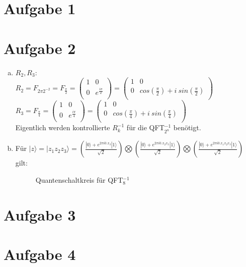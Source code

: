 \documentclass[a4paper]{scrartcl}
\begin{document}
\section*{Aufgabe 1}

\newpage
\section*{Aufgabe 2}
\begin{enumerate}[a)]
\item
$R_2, R_3:$\\
$R_2=F_{2\pi 2^{-2}}=F_{\frac{\pi}{2}} = 
\begin{pmatrix}
1 & 0 \\ 0 & e^{\frac{i \pi}{2}} \\
\end{pmatrix} = 
\begin{pmatrix}
1 & 0 \\ 0 & cos(\frac{\pi}{2})+i~sin(\frac{\pi}{2})\\
\end{pmatrix}$ \\
$R_3=F_{\frac{\pi}{4}} = 
\begin{pmatrix}
1 & 0 \\ 0 & e^{\frac{i \pi}{4}} \\
\end{pmatrix} = 
\begin{pmatrix}
1 & 0 \\ 0 & cos(\frac{\pi}{4})+i~sin(\frac{\pi}{4})\\
\end{pmatrix}$ \\
Eigentlich werden kontrollierte $R_k^{-1}$ für die QFT$_{2^n}^{-1}$ benötigt.

\item Für $|z\rangle = |z_1 z_2 z_3\rangle= (\frac{|0\rangle+e^{2\pi i0.x_3} |1\rangle }{\sqrt{2}})\bigotimes(\frac{|0\rangle+e^{2\pi i0.x_2x_3} |1\rangle }{\sqrt{2}})\bigotimes(\frac{|0\rangle+e^{2\pi i0.x_1x_2x_3} |1\rangle }{\sqrt{2}})$ gilt:

\begin{figure}[htp] 
\caption{Quantenschaltkreis für QFT$_{8}^{-1}$}
\end{figure}


\end{enumerate}

\newpage
\section*{Aufgabe 3}

\newpage
\section*{Aufgabe 4}
\end{document}
